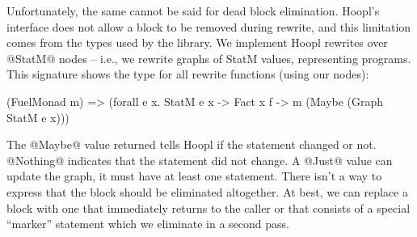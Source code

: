 \documentclass[12pt]{report}
\begin{document}
Unfortunately, the same cannot be said for dead block
elimination. Hoopl's interface does not allow a block to be removed
during rewrite, and this limitation comes from the types used by
the library. We implement Hoopl rewrites over @StatM@ nodes -- i.e., we rewrite
graphs of StatM values, representing programs. This signature shows the type for all  rewrite functions (using our nodes):

\begin{code}
(FuelMonad m) => (forall e x.
  StatM e x
  -> Fact x f
  -> m (Maybe (Graph StatM e x)))
\end{code}

The @Maybe@ value returned tells Hoopl if the statement changed or
not. @Nothing@ indicates that the statement did not change. A
@Just@ value can update the graph, it must have at least one
statement. There isn't a way to express that the block should be
eliminated altogether. At best, we can replace a block with one that
immediately returns to the caller or that consists of a special
``marker'' statement which we eliminate in a second pass.
\end{document}
